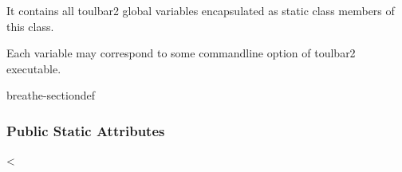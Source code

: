 \documentclass[letterpaper,10pt,openany,oneside,english]{sphinxmanual}
\begin{document}
\begin{fulllineitems}
\label{\detokenize{ref/ref_cpp:_CPPv48ToulBar2}}\label{\detokenize{ref/ref_cpp:_CPPv38ToulBar2}}\label{\detokenize{ref/ref_cpp:_CPPv28ToulBar2}}\label{\detokenize{ref/ref_cpp:ToulBar2}}
\pysigstartsignatures
\pysigstartmultiline
{}
\pysigstopmultiline
\pysigstopsignatures
\sphinxAtStartPar
It contains all toulbar2 global variables encapsulated as static class members of this class.

\sphinxAtStartPar
Each variable may correspond to some command\sphinxhyphen{}line option of toulbar2 executable. 

\begin{sphinxuseclass}{breathe-sectiondef}\subsubsection*{Public Static Attributes}

\begin{fulllineitems}
\label{\detokenize{ref/ref_cpp:_CPPv4N8ToulBar27versionE}}\label{\detokenize{ref/ref_cpp:_CPPv3N8ToulBar27versionE}}\label{\detokenize{ref/ref_cpp:_CPPv2N8ToulBar27versionE}}\label{\detokenize{ref/ref_cpp:ToulBar2::version__string}}
\pysigstartsignatures
\pysigstartmultiline
{}
\pysigstopmultiline
\pysigstopsignatures
\end{fulllineitems}


\begin{fulllineitems}
\label{\detokenize{ref/ref_cpp:_CPPv4N8ToulBar27verboseE}}\label{\detokenize{ref/ref_cpp:_CPPv3N8ToulBar27verboseE}}\label{\detokenize{ref/ref_cpp:_CPPv2N8ToulBar27verboseE}}\label{\detokenize{ref/ref_cpp:ToulBar2::verbose__i}}
\pysigstartsignatures
\pysigstartmultiline
{}
\pysigstopmultiline
\pysigstopsignatures
\sphinxAtStartPar
\textless{} 


\end{fulllineitems}
\end{sphinxuseclass}
\end{fulllineitems}
\end{document}
